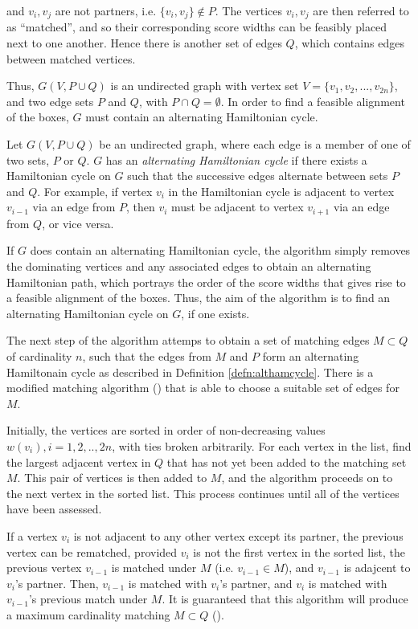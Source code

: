 \documentclass[oribibl]{llncs}
\begin{document}
and $v_i, v_j$ are not partners, i.e. $\{v_i, v_j\} \notin P$. The vertices $v_i, v_j$ are then referred to as ``matched'', and so their corresponding score widths can be feasibly placed next to one another. Hence there is another set of edges $Q$, which contains edges between matched vertices. 

Thus, $G(V, P\cup Q)$ is an undirected graph with vertex set $V = \{v_1, v_2, ..., v_{2n}\}$, and two edge sets $P$ and $Q$, with $P \cap Q = \emptyset$. In order to find a feasible alignment of the boxes, $G$ must contain an alternating Hamiltonian cycle.

\begin{definition}
	Let $G(V, P\cup Q)$ be an undirected graph, where each edge is a member of one of two sets, $P$ or $Q$. $G$ has an \textit{alternating Hamiltonian cycle} if there exists a Hamiltonian cycle on $G$ such that the successive edges alternate between sets $P$ and $Q$. For example, if vertex $v_i$ in the Hamiltonian cycle is adjacent to vertex $v_{i-1}$ via an edge from $P$, then $v_i$ must be adjacent to vertex $v_{i+1}$ via an edge from $Q$, or vice versa. 
\end{definition}

If $G$ does contain an alternating Hamiltonian cycle, the algorithm simply removes the dominating vertices and any associated edges to obtain an alternating Hamiltonian path, which portrays the order of the score widths that gives rise to a feasible alignment of the boxes. Thus, the aim of the algorithm is to find an alternating Hamiltonian cycle on $G$, if one exists.

The next step of the algorithm attemps to obtain a set of matching edges $M \subset Q$ of cardinality $n$, such that the edges from $M$ and $P$ form an alternating Hamiltonain cycle as described in Definition \ref{defn:althamcycle}. There is a modified matching algorithm (\citealp{mahadev1994, becker2010}) that is able to choose a suitable set of edges for $M$.

Initially, the vertices are sorted in order of non-decreasing values $w(v_i), i = 1,2, .., 2n$, with ties broken arbitrarily. For each vertex in the list, find the largest adjacent vertex in $Q$ that has not yet been added to the matching set $M$. This pair of vertices is then added to $M$, and the algorithm proceeds on to the next vertex in the sorted list. This process continues until all of the vertices have been assessed. 

If a vertex $v_i$ is not adjacent to any other vertex except its partner, the previous vertex can be rematched, provided $v_i$ is not the first vertex in the sorted list, the previous vertex $v_{i-1}$ is matched under $M$ (i.e. $v_{i-1} \in M$), and $v_{i-1}$ is adajcent to $v_i$'s partner. Then, $v_{i-1}$ is matched with $v_i$'s partner, and $v_i$ is matched with $v_{i-1}$'s previous match under $M$. It is guaranteed that this algorithm will produce a maximum cardinality matching $M \subset Q$ (\citealp{becker2010}).
\end{document}
